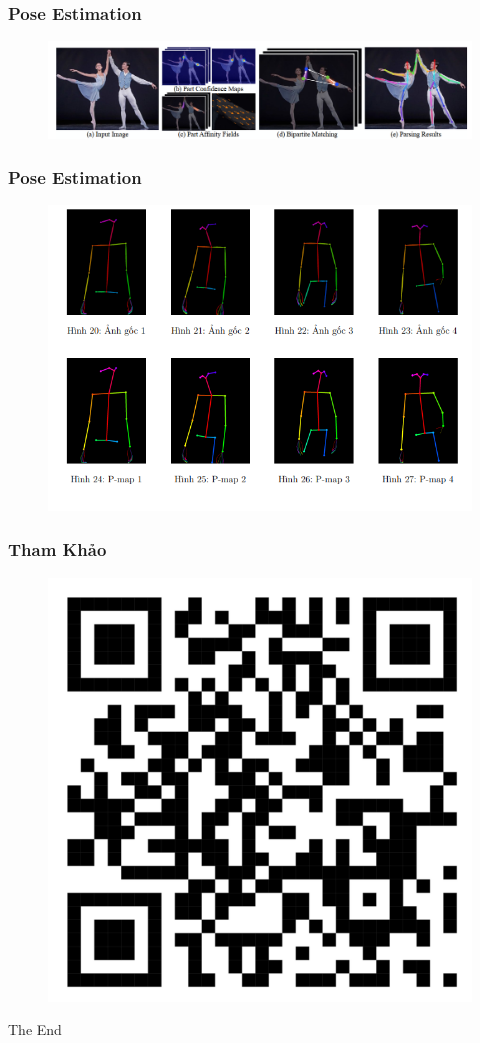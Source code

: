 \documentclass{beamer}
\begin{document}
\begin{frame}
\frametitle{Pose Estimation}

\begin{figure}
    \centering
    \includegraphics[width=1\linewidth]{p5.png}
    
    
\end{figure}

\end{frame}
\begin{frame}
\frametitle{Pose Estimation}

\begin{figure}
    \centering
    \includegraphics[width=1\linewidth]{p7.png}
    
    
\end{figure}

\end{frame}


\begin{frame}
\frametitle{Tham Khảo}



\begin{figure}
    \centering
    \includegraphics[width=0.5\linewidth]{images/qr.png}
\end{figure}


\end{frame}

\begin{frame}
\Huge{\centerline{The End}}
\end{frame}

\end{document}
